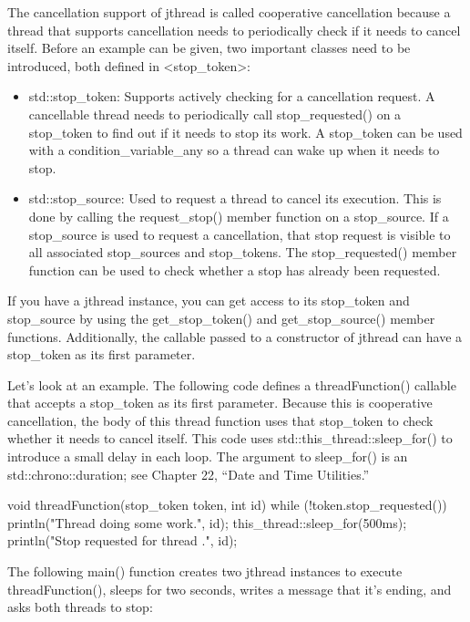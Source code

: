 
The cancellation support of jthread is called cooperative cancellation because a thread that supports cancellation needs to periodically check if it needs to cancel itself. Before an example can be given, two important classes need to be introduced, both defined in <stop\_token>:

\begin{itemize}
\item
std::stop\_token: Supports actively checking for a cancellation request. A cancellable thread needs to periodically call stop\_requested() on a stop\_token to find out if it needs to stop its work. A stop\_token can be used with a condition\_variable\_any so a thread can wake up when it needs to stop.

\item
std::stop\_source: Used to request a thread to cancel its execution. This is done by calling the request\_stop() member function on a stop\_source. If a stop\_source is used to request a cancellation, that stop request is visible to all associated stop\_sources and stop\_tokens. The stop\_requested() member function can be used to check whether a stop has already been requested.
\end{itemize}

If you have a jthread instance, you can get access to its stop\_token and stop\_source by using the get\_stop\_token() and get\_stop\_source() member functions. Additionally, the callable passed to a constructor of jthread can have a stop\_token as its first parameter.

Let’s look at an example. The following code defines a threadFunction() callable that accepts a stop\_token as its first parameter. Because this is cooperative cancellation, the body of this thread function uses that stop\_token to check whether it needs to cancel itself. This code uses std::this\_thread::sleep\_for() to introduce a small delay in each loop. The argument to sleep\_for() is an std::chrono::duration; see Chapter 22, “Date and Time Utilities.”

\begin{cpp}
void threadFunction(stop_token token, int id)
{
    while (!token.stop_requested()) {
        println("Thread {} doing some work.", id);
        this_thread::sleep_for(500ms);
    }
    println("Stop requested for thread {}.", id);
}
\end{cpp}

The following main() function creates two jthread instances to execute threadFunction(), sleeps for two seconds, writes a message that it’s ending, and asks both threads to stop:

